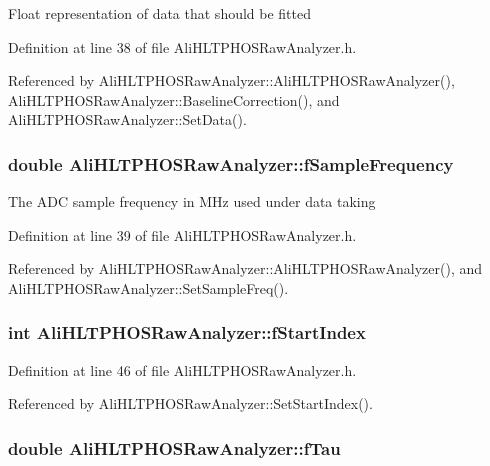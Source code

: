 Float representation of data that should be fitted 

Definition at line 38 of file Ali\-HLTPHOSRaw\-Analyzer.h.

Referenced by Ali\-HLTPHOSRaw\-Analyzer::Ali\-HLTPHOSRaw\-Analyzer(), Ali\-HLTPHOSRaw\-Analyzer::Baseline\-Correction(), and Ali\-HLTPHOSRaw\-Analyzer::Set\-Data().
\subsubsection{\setlength{\rightskip}{0pt plus 5cm}double {\bf Ali\-HLTPHOSRaw\-Analyzer::f\-Sample\-Frequency}\hspace{0.3cm}{\tt  [protected, inherited]}}\label{classAliHLTPHOSRawAnalyzer_AliHLTPHOSRawAnalyzerPeakFinderp1}


The ADC sample frequency in MHz used under data taking 

Definition at line 39 of file Ali\-HLTPHOSRaw\-Analyzer.h.

Referenced by Ali\-HLTPHOSRaw\-Analyzer::Ali\-HLTPHOSRaw\-Analyzer(), and Ali\-HLTPHOSRaw\-Analyzer::Set\-Sample\-Freq().
\subsubsection{\setlength{\rightskip}{0pt plus 5cm}int {\bf Ali\-HLTPHOSRaw\-Analyzer::f\-Start\-Index}\hspace{0.3cm}{\tt  [protected, inherited]}}\label{classAliHLTPHOSRawAnalyzer_AliHLTPHOSRawAnalyzerPeakFinderp7}




Definition at line 46 of file Ali\-HLTPHOSRaw\-Analyzer.h.

Referenced by Ali\-HLTPHOSRaw\-Analyzer::Set\-Start\-Index().
\subsubsection{\setlength{\rightskip}{0pt plus 5cm}double {\bf Ali\-HLTPHOSRaw\-Analyzer::f\-Tau}\hspace{0.3cm}{\tt  [protected, inherited]}}\label{classAliHLTPHOSRawAnalyzer_AliHLTPHOSRawAnalyzerPeakFinderp4}


